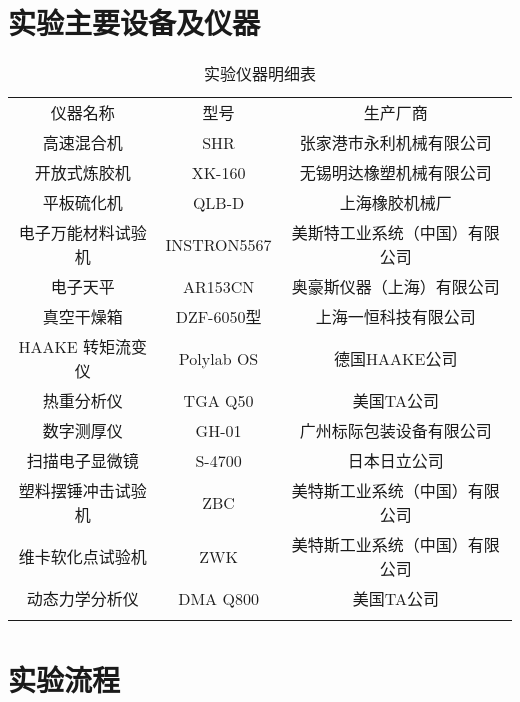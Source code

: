 \section{实验主要设备及仪器}

\begin{table}[H]
	\caption{实验仪器明细表}
	\label{tabEqu}
	\begin{center}
		\begin{tabular}{ccc}
				\borderLine
				仪器名称 & 型号 & 生产厂商		\\
				\interLine
				高速混合机 & SHR & 张家港市永利机械有限公司	\\
				开放式炼胶机 & XK-160 & 无锡明达橡塑机械有限公司	\\
				平板硫化机 & QLB-D & 上海橡胶机械厂	\\
				电子万能材料试验机 & INSTRON5567 & 美斯特工业系统（中国）有限公司	\\
				电子天平 & AR153CN & 奥豪斯仪器（上海）有限公司	\\
				真空干燥箱 & DZF-6050型 & 上海一恒科技有限公司	\\
				HAAKE 转矩流变仪 & Polylab OS & 德国HAAKE公司	\\
				热重分析仪 & TGA Q50 & 美国TA公司	\\
				数字测厚仪 & GH-01 & 广州标际包装设备有限公司	\\
				扫描电子显微镜 & S-4700 & 日本日立公司	\\
				塑料摆锤冲击试验机 & ZBC & 美特斯工业系统（中国）有限公司	\\
				维卡软化点试验机 & ZWK & 美特斯工业系统（中国）有限公司	\\
				动态力学分析仪 & DMA Q800 & 美国TA公司	\\
				\borderLine
		\end{tabular}
	\end{center}
\end{table}

\section{实验流程}

